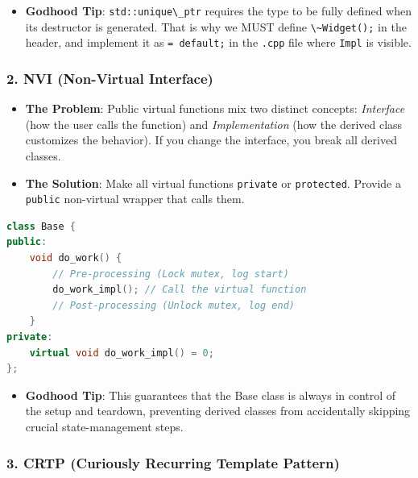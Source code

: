 \begin{itemize}
\tightlist
\item
  \textbf{Godhood Tip}: \passthrough{\lstinline!std::unique\_ptr!}
  requires the type to be fully defined when its destructor is
  generated. That is why we MUST define
  \passthrough{\lstinline!\~Widget();!} in the header, and implement it
  as \passthrough{\lstinline!= default;!} in the
  \passthrough{\lstinline!.cpp!} file where
  \passthrough{\lstinline!Impl!} is visible.
\end{itemize}

\hypertarget{nvi-non-virtual-interface}{%
\subsubsection{2. NVI (Non-Virtual
Interface)}\label{nvi-non-virtual-interface}}

\begin{itemize}
\tightlist
\item
  \textbf{The Problem}: Public virtual functions mix two distinct
  concepts: \emph{Interface} (how the user calls the function) and
  \emph{Implementation} (how the derived class customizes the behavior).
  If you change the interface, you break all derived classes.
\item
  \textbf{The Solution}: Make all virtual functions
  \passthrough{\lstinline!private!} or
  \passthrough{\lstinline!protected!}. Provide a
  \passthrough{\lstinline!public!} non-virtual wrapper that calls them.
\end{itemize}

\begin{lstlisting}[language={C++}]
class Base {
public:
    void do_work() {
        // Pre-processing (Lock mutex, log start)
        do_work_impl(); // Call the virtual function
        // Post-processing (Unlock mutex, log end)
    }
private:
    virtual void do_work_impl() = 0;
};
\end{lstlisting}

\begin{itemize}
\tightlist
\item
  \textbf{Godhood Tip}: This guarantees that the Base class is always in
  control of the setup and teardown, preventing derived classes from
  accidentally skipping crucial state-management steps.
\end{itemize}

\hypertarget{crtp-curiously-recurring-template-pattern}{%
\subsubsection{3. CRTP (Curiously Recurring Template
Pattern)}\label{crtp-curiously-recurring-template-pattern}}

